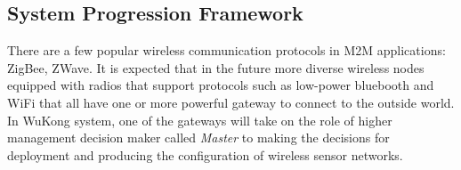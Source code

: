 \subsection{System Progression Framework}

There are a few popular wireless communication protocols in M2M applications:
ZigBee, ZWave. It is expected that in the future more diverse
wireless nodes equipped with radios that support protocols such as low-power
bluebooth and WiFi that all have one or more powerful gateway to connect to the
outside world. In WuKong system, one of the gateways will take on the role of
higher management decision maker called \emph{Master} to making the decisions for
deployment and producing the configuration of wireless sensor networks.

